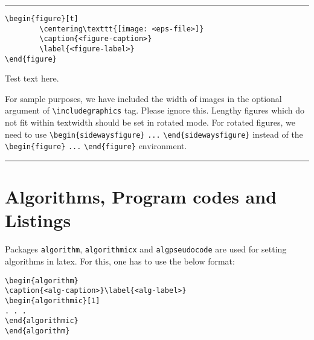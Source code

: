 \documentclass[unnumsec,webpdf,contemporary,large]{oup-authoring-template}%
\theoremstyle{thmstyleone}%
\theoremstyle{thmstyletwo}%
\theoremstyle{thmstylethree}%
\begin{document}
\begin{figure*}[!t]%
	\centering
	{\color{black!20}\rule{438pt}{74pt}}
	\caption{This is a widefig. This is an example of a long caption this is an example of a long caption  this is an example of a long caption this is an example of a long caption}\label{fig2}
\end{figure*}


\begin{verbatim}
\begin{figure}[t]
        \centering\texttt{[image: <eps-file>]}
        \caption{<figure-caption>}
        \label{<figure-label>}
\end{figure}
\end{verbatim}

Test text here.

For sample purposes, we have included the width of images in the
optional argument of \verb+\includegraphics+ tag. Please ignore this.
Lengthy figures which do not fit within textwidth should be set in rotated mode. For rotated figures, we need to use \verb+\begin{sidewaysfigure}+ \verb+...+ \verb+\end{sidewaysfigure}+ instead of the \verb+\begin{figure}+ \verb+...+ \verb+\end{figure}+ environment.

\begin{sidewaysfigure}%
	\centering
	{\color{black!20}\rule{610pt}{102pt}}
	\caption{This is an example for a sideways figure. This is an example of a long caption this is an example of a long caption  this is an example of a long caption this is an example of a long caption}\label{fig3}
\end{sidewaysfigure}



\section{Algorithms, Program codes and Listings}\label{sec7}

Packages \verb+algorithm+, \verb+algorithmicx+ and \verb+algpseudocode+ are used for setting algorithms in latex.
For this, one has to use the below format:


\begin{verbatim}
\begin{algorithm}
\caption{<alg-caption>}\label{<alg-label>}
\begin{algorithmic}[1]
. . .
\end{algorithmic}
\end{algorithm}
\end{verbatim}
\end{document}
